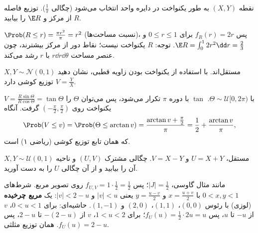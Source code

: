 \begin{exercise}
نقطه $(X,Y)$ به طور یکنواخت در دایره واحد انتخاب می‌شود (چگالی $\frac1\pi$). توزیع فاصله $R$ از مرکز و $\E R$ را بیابید.
\end{exercise}
\begin{solution}
$\Prob(R\le r)=\frac{\pi r^2}{\pi}=r^2$ (نسبت مساحت‌ها)، پس $f_R(r)=2r$ برای $0\le r\le1$ و $\E R=\int_0^12r^2\dd r=\frac23$. توجه: $R$ یکنواخت نیست؛ نقاط دور از مرکز بیشترند، چون عنصر مساحت $r\dd r\dd\theta$ با $r$ رشد می‌کند.
\end{solution}

\begin{exercise}
$X,Y\sim\mathcal N(0,1)$ مستقل‌اند. با استفاده از یکنواخت بودن زاویه قطبی، نشان دهید $V=\frac YX$ توزیع کوشی دارد.
\end{exercise}
\begin{solution}
$V=\frac{R\sin\Theta}{R\cos\Theta}=\tan\Theta$ با $\Theta\sim\mathcal U[0,2\pi)$. $\tan$ با دوره $\pi$ تکرار می‌شود، پس می‌توان $\Theta$ را یکنواخت روی $(-\frac\pi2,\frac\pi2)$ گرفت. آنگاه
\[
\Prob(V\le v)=\Prob(\Theta\le\arctan v)=\frac{\arctan v+\frac\pi2}{\pi}=\frac12+\frac{\arctan v}{\pi},
\]
که همان تابع توزیع کوشی (ریاضی ۱) است.
\end{solution}

\begin{exercise}
$X,Y\sim\mathcal U(0,1)$ مستقل، $U=X+Y$ و $V=X-Y$. چگالی مشترک $(U,V)$ و ناحیه آن را بیابید و از آن چگالی $U$ را به دست آورید.
\end{exercise}
\begin{solution}
مانند مثال گاوسی، $|J|=\frac12$؛ پس $f_{U,V}=1\cdot\frac12=\frac12$ روی تصویر مربع. شرط‌های $0<x,y<1$ با $x=\frac{u+v}{2}$ و $y=\frac{u-v}{2}$ یعنی $|v|<u$ و $|v|<2-u$: یک \textbf{مربع چرخیده} (لوزی) با رئوس $(0,0)$، $(1,1)$، $(2,0)$ و $(1,-1)$. حاشیه‌ای: برای $0<u<1$، $v$ از $-u$ تا $u$، پس $f_U(u)=\frac12\cdot2u=u$؛ برای $1<u<2$، $v$ از $-(2-u)$ تا $2-u$، پس $f_U(u)=2-u$. همان توزیع مثلثی.
\end{solution}

